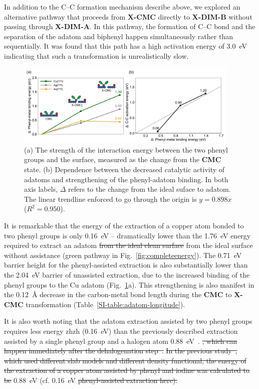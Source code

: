\documentclass[aps,prb,amsmath,amssymb,11pt]{revtex4-1}
\newcommand{\zhzh}{\color{blue}}
\begin{document}
{\zhzh In addition to the C--C formation mechanism describe above, we explored an alternative pathway that proceeds from \textbf{X-CMC} directly to \textbf{X-DIM-B} without passing through \textbf{X-DIM-A}. In this pathway, the formation of C--C bond and the separation of the adatom and biphenyl happen simultaneously rather than sequentially. It was found that this path has a high activation energy of \SI{3.0}{\electronvolt} indicating that such a transformation is unrealistically slow.}

\begin{figure}[bt]
\centering
\includegraphics[width=0.95\textwidth]{Fig/onlysurface.pdf}
\caption{
(a) The strength of the interaction energy between the two phenyl groups and the surface, measured as the change from the \textbf{CMC} state. (b) Dependence between the decreased catalytic activity of adatoms and strengthening of the phenyl-adatom binding. In both axis labels, $\Delta$ refers to the change from the ideal suface to adatom. The linear trendline enforced to go through the origin is $y=0.898 x$ ($R^2 = 0.950$).}
\label{fig:onlysurface}
\end{figure}

It is remarkable that the energy of the extraction of a copper atom bonded to two phenyl groups is only \SI{0.16}{\electronvolt} -- dramatically lower than the \SI{1.76}{\electronvolt} energy required to extract an adatom \sout{from the ideal clean surface} {\zhzh from the ideal surface without assistance} (green pathway in Fig.~\ref{fig:completeenergy}). The \SI{0.71}{\electronvolt} barrier height for the phenyl-assisted extraction is also substantially lower than the \SI{2.04}{\electronvolt} barrier of unassisted extraction, due to the increased binding of the phenyl groups to the Cu adatom (Fig.~\ref{fig:onlysurface}a). This strengthening is also manifest in the \SI{0.12}{\angstrom} decrease in the carbon-metal bond length during the \textbf{CMC} to \textbf{X-CMC} transformation (Table~\ref{SI-table:adatom-longitude}).

It is also worth noting that the adatom extraction assisted by two phenyl groups requires less energy {zhzh (\SI{0.16}{\electronvolt})} than the previously described extraction assisted by a single phenyl group and a halogen atom {\zhzh \SI{0.88}{\electronvolt}~\cite{chemeurope2017}.} \sout{, which can happen immediately after the dehalogenation step~\cite{chemeurope2017}.} \sout{In the previous study~\cite{chemeurope2017}, which used different slab models and different density functional, the energy of the extraction of a copper atom assisted by phenyl and iodine was calculated to be }\SI{0.88}{\electronvolt} (cf. \SI{0.16}{\electronvolt} \sout{phenyl-assisted extraction here).}
\end{document}
